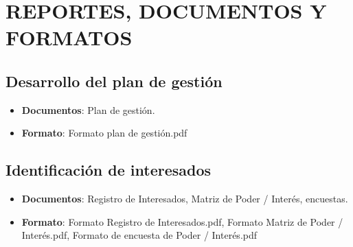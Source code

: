 \chapter{REPORTES, DOCUMENTOS Y FORMATOS}
%
\section{Desarrollo del plan de gesti\'on}
%
\begin{itemize}
	\item \textbf{Documentos}: Plan de gesti\'on.
	\item \textbf{Formato}: Formato plan de gesti\'on.pdf
\end{itemize}
%
\section{Identificaci\'on de interesados}
%
\begin{itemize}
	\item \textbf{Documentos}: Registro de Interesados, Matriz de Poder / Inter\'es, encuestas.
	\item \textbf{Formato}: Formato Registro de Interesados.pdf, Formato Matriz de Poder / 
	Inter\'es.pdf, Formato de encuesta de Poder / Inter\'es.pdf
\end{itemize}